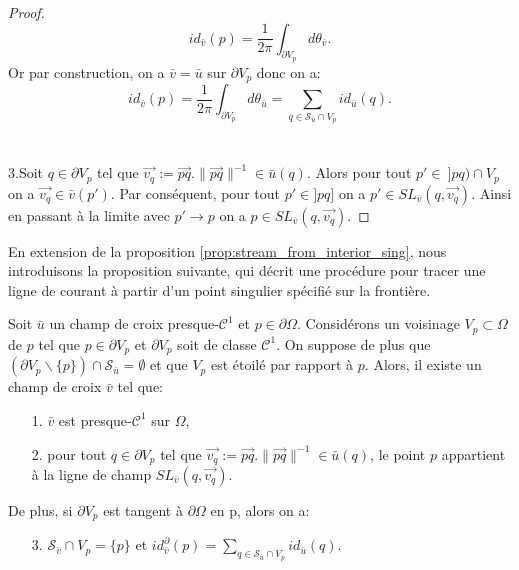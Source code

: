 \begin{proof}
$$id_{\bar{v}}(p)=\frac{1}{2\pi}\int_{\partial V_p}d\theta_{\bar{v}}.$$
Or par construction, on a $\bar{v}=\bar{u}$ sur $\partial V_p$ donc on a:
$$id_{\bar{v}}(p)=\frac{1}{2\pi}\int_{\partial V_p}d\theta_{\bar{u}}=\sum_{q\in\mathcal{S}_{\bar{u}}\cap V_p}id_{\bar{u}}(q).$$\\\\
3.\quad Soit $q\in\partial V_p$ tel que $\overrightarrow{v_q}:=\overrightarrow{pq}.\|\overrightarrow{pq}\|^{-1} \in \bar{u}(q)$. Alors pour tout $p'\in~]pq)\cap V_p$ on a $\overrightarrow{v_q}\in\bar{v}(p')$. Par conséquent, pour tout $p'\in]pq]$ on a $p'\in SL_{\bar{v}}(q,\overrightarrow{v_q})$. Ainsi en passant à la limite avec $p'\longrightarrow p$ on a $p\in SL_{\bar{v}}(q,\overrightarrow{v_q})$.
\end{proof}

En extension de la proposition \ref{prop:stream_from_interior_sing}, nous introduisons la proposition suivante, qui décrit une procédure pour tracer une ligne de courant à partir d'un point singulier spécifié sur la frontière.

\begin{proposition}
\label{prop:stream_from_bord_sing}
Soit $\bar{u}$ un champ de croix presque-$\mathcal{C}^1$ et $p\in\partial\Omega$. Considérons un voisinage $V_p\subset\Omega$ de $p$ tel que $p\in\partial V_p$ et $\partial V_p$ soit de classe $\mathcal{C}^1$. On suppose de plus que $(\partial V_p\backslash\{p\})\cap\mathcal{S}_{\bar{u}}=\emptyset$ et que $V_p$ est étoilé par rapport à $p$. Alors, il existe un champ de croix $\bar{v}$ tel que:
\begin{enumerate}
\item[1.] $\bar{v}$ est presque-$\mathcal{C}^1$ sur $\Omega$,\\[-0.3cm]
\item[2.] pour tout $q\in \partial V_p$ tel que $\overrightarrow{v_q}:=\overrightarrow{pq}.\|\overrightarrow{pq}\|^{-1}\in \bar{u}(q)$, le point $p$ appartient à la ligne de champ $SL_{\bar{v}}(q,\overrightarrow{v_q})$.\\[-0.3cm]
\end{enumerate}
De plus, si $\partial V_p$ est tangent à $\partial\Omega$ en p, alors on a:
\begin{enumerate}
\item[3.] $\mathcal{S}_{\bar{v}}\cap V_p =\{p\}$ et $id^\partial_{\bar{v}}(p)=\sum_{q\in \mathcal{S}_{\bar{u}}\cap V_p} id_{\bar{u}}(q)$.\\[-0.3cm]
\end{enumerate}
\end{proposition}

